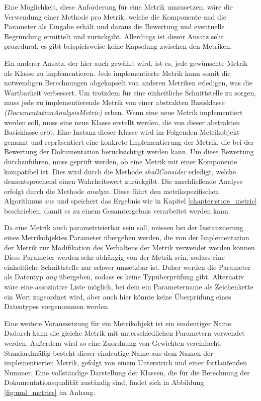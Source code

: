 Eine Möglichkeit, diese Anforderung für eine Metrik umzusetzen, wäre die Verwendung einer Methode pro Metrik, welche die Komponente und die Parameter als Eingabe erhält und daraus die Bewertung und eventuelle Begründung ermittelt und zurückgibt. Allerdings ist dieser Ansatz sehr prozedural; es gibt beispielsweise keine Kapselung zwischen den Metriken.  

Ein anderer Ansatz, der hier auch gewählt wird, ist es, jede gewünschte Metrik als Klasse zu implementieren. Jede implementierte Metrik kann somit die notwendigen Berechnungen abgekapselt von anderen Metriken erledigen, was die Wartbarkeit verbessert. Um trotzdem für eine einheitliche Schnittstelle zu sorgen, muss jede zu implementierende Metrik von einer abstrakten Basisklasse \textit{(DocumentationAnalysisMetric)} erben. Wenn eine neue Metrik implementiert werden soll, muss eine neue Klasse erstellt werden, die von dieser abstrakten Basisklasse erbt. Eine Instanz dieser Klasse wird im Folgenden Metrikobjekt genannt und repräsentiert eine konkrete Implementierung der Metrik, die bei der Bewertung der Dokumentation berücksichtigt werden kann. Um diese Bewertung durchzuführen, muss geprüft werden, ob eine Metrik mit einer Komponente kompatibel ist. Dies wird durch die  Methode \textit{shallConsider} erledigt,  welche dementsprechend einen Wahrheitswert zurückgibt. Die anschließende Analyse erfolgt durch die Methode \textit{analyze}. Diese führt den metrikspezifischen Algorithmus aus und speichert das Ergebnis wie in Kapitel \ref{chapter:store_metric} beschrieben, damit es zu einem Gesamtergebnis verarbeitet werden kann.

Da eine Metrik auch parametrisierbar sein soll, müssen bei der Instanziierung  eines Metrikobjektes Parameter übergeben werden, die von der Implementation der Metrik zur Modifikation des Verhaltens der Metrik verwendet werden können. Diese Parameter werden sehr abhängig von der Metrik sein, sodass eine einheitliche Schnittstelle nur schwer umsetzbar ist. Daher werden die Parameter als Datentyp \textit{any} übergeben, sodass es keine Typüberprüfung gibt. Alternativ wäre eine assoziative Liste möglich, bei dem ein Parametername als Zeichenkette ein Wert zugeordnet wird, aber auch hier könnte keine Überprüfung eines Datentypes vorgenommen werden. 

Eine  weitere Voraussetzung für ein Metrikobjekt ist ein eindeutiger Name. Dadurch kann die gleiche Metrik mit unterschiedlichen Parametern verwendet werden. Außerdem wird so eine Zuordnung von Gewichten vereinfacht. Standardmäßig besteht dieser eindeutige Name aus dem Namen der implementierten Metrik, gefolgt von einem Unterstrich und einer fortlaufenden Nummer. Eine vollständige Darstellung der Klassen, die für die Berechnung der Dokumentationsqualität zuständig sind, findet sich in Abbildung \ref{fig:uml_metrics} im Anhang.


